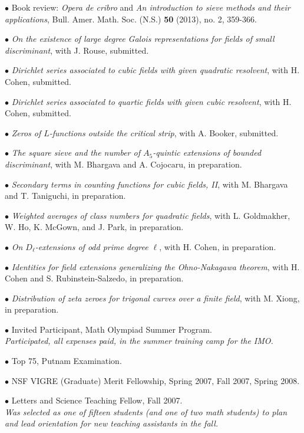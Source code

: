 \documentclass{article}
\newcommand{\categorywidth}{1in}        %
\newcommand{\categorysep}{5pt}
\newcommand{\catlistlabel}[1]%
{\raisebox{0pt}[1ex][0pt]{\makebox[\labelwidth][l]%
    {\parbox[t]{\labelwidth}{\hspace{0pt}\textbf{#1}}}}}
\newenvironment{categories}{\begin{list}{}{
      \setlength{\labelwidth}{\categorywidth}
      \setlength{\leftmargin}{\labelwidth}
      \addtolength{\leftmargin}{\labelsep}
      \setlength{\topsep}{20pt}
      \setlength{\itemsep}{\categorysep}
      \renewcommand{\makelabel}{\catlistlabel}
      }}{\end{list}}
\newcommand{\category}[1]{\item[#1]}
\begin{document}
\begin{flushleft}
\begin{categories}
{  $\bullet$ Book review: {\itshape Opera de cribro} and {\itshape
  An introduction to sieve methods and their applications},
  Bull. Amer. Math. Soc. (N.S.) \textbf{50} (2013), no. 2, 359-366.

  $\bullet$ {\itshape On the existence of large degree Galois representations for fields of small
discriminant}, with J. Rouse, submitted.

  $\bullet$ {\itshape Dirichlet series associated to cubic fields with given quadratic resolvent}, with H. Cohen,
submitted.

  $\bullet$ {\itshape Dirichlet series associated to quartic fields with given cubic resolvent}, with H. Cohen, submitted.

  $\bullet$ {\itshape Zeros of $L$-functions outside the critical strip}, with A. Booker, submitted.

  $\bullet$ {\itshape The square sieve and the number of $A_5$-quintic extensions of bounded discriminant}, 
with M. Bhargava and A. Cojocaru, in preparation.

  $\bullet$ {\itshape Secondary terms in counting functions for cubic fields, II}, 
with M. Bhargava and T. Taniguchi, in preparation.

  $\bullet$ {\itshape Weighted averages of class numbers for quadratic fields},
with L. Goldmakher, W. Ho, K. McGown, and J. Park, in preparation.

  $\bullet$ {\itshape On $D_{\ell}$-extensions of odd prime degree $\ell$}, 
with H. Cohen, in preparation.

  $\bullet$ {\itshape Identities for field extensions generalizing the Ohno-Nakagawa theorem}, 
with H. Cohen and S. Rubinstein-Salzedo, in preparation.

  $\bullet$ {\itshape Distribution of zeta zeroes for trigonal curves over a finite field}, 
with M. Xiong, in preparation.


  \category{Awards, Grants, \\ and Prizes}

  $\bullet$ {Invited Participant, Math Olympiad Summer Program. \\
  \itshape Participated, all expenses paid, in the summer training camp for the IMO. \upshape }

  $\bullet$ {Top 75, Putnam Examination.}

  $\bullet$ {NSF VIGRE (Graduate) Merit Fellowship, Spring 2007, Fall 2007, Spring 2008.}

  $\bullet$ {Letters and Science Teaching Fellow, Fall 2007. \\
\itshape Was selected as one of fifteen students (and one of two math students)
to plan and lead orientation for new teaching assistants in the fall.
\upshape }

}
\end{categories}
\end{flushleft}
\end{document}
